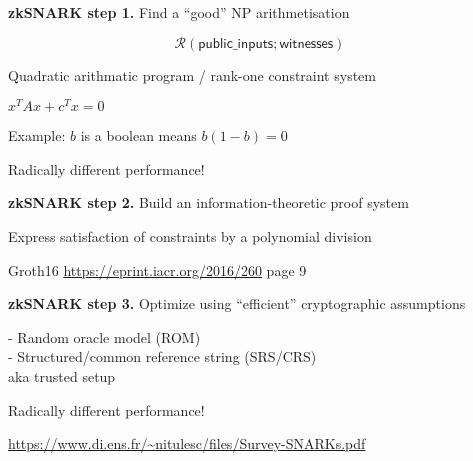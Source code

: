 \documentclass{beamer}
\begin{document}
\begin{frame}

{\bf zkSNARK step 1.}  Find a ``good'' NP arithmetisation \\ \bigskip


$$ \mathcal{R}( \mathsf{public\_inputs} ; \mathsf{witnesses} ) $$

\smallskip

Quadratic arithmatic program / rank-one constraint system

\medskip

\begin{center} $x^T A x + c^T x = 0$ \end{center}

\bigskip

Example: $b$ is a boolean means $b (1-b) = 0$

\bigskip\bigskip\bigskip

{\color{red} Radically different performance!}

\end{frame}



\begin{frame}

{\bf zkSNARK step 2.}  Build an information-theoretic proof system \\ \bigskip

Express satisfaction of constraints by a polynomial division 

\bigskip\bigskip

Groth16 \url{https://eprint.iacr.org/2016/260} page 9 \\

\end{frame}



\begin{frame}

{\bf zkSNARK step 3.}  Optimize using ``efficient'' cryptographic assumptions \\ \bigskip

- Random oracle model (ROM) \\ \smallskip
- Structured/common reference string (SRS/CRS)  \\
\hspace{10pt}  aka trusted setup \\

\bigskip\bigskip\bigskip

{\color{red} Radically different performance!}

\bigskip\bigskip

{\small \url{https://www.di.ens.fr/~nitulesc/files/Survey-SNARKs.pdf}}

\end{frame}
\end{document}
